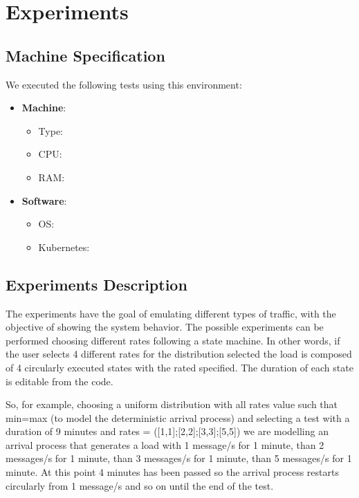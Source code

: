 \section{Experiments}

\subsection{Machine Specification}
We executed the following tests using this environment:


\begin{itemize}
    \item \textbf{Machine}:
    \begin{itemize}
        \item Type:
        \item CPU: 
        \item RAM: 
    \end{itemize}
    \item \textbf{Software}:
    \begin{itemize}
        \item OS: 
        \item Kubernetes: 
    \end{itemize}
\end{itemize}

\subsection{Experiments Description}
The experiments have the goal of emulating different types of traffic, with the objective of showing the system behavior. The possible experiments can be performed choosing different rates following a state machine. In other words, if the user selects 4 different rates for the distribution selected the load is composed of 4 circularly executed states with the rated specified. The duration of each state is editable from the code.

So, for example, choosing a uniform distribution with all rates value such that min=max (to model the deterministic arrival process) and selecting a test with a duration of 9 minutes and rates = ([1,1];[2,2];[3,3];[5,5]) we are modelling an arrival process that generates a load with 1 message/s for 1 minute, than 2 messages/s for 1 minute, than 3 messages/s for 1 minute, than 5 messages/s for 1 minute. At this point 4 minutes has been passed so the arrival process restarts circularly from 1 message/s and so on until the end of the test.


